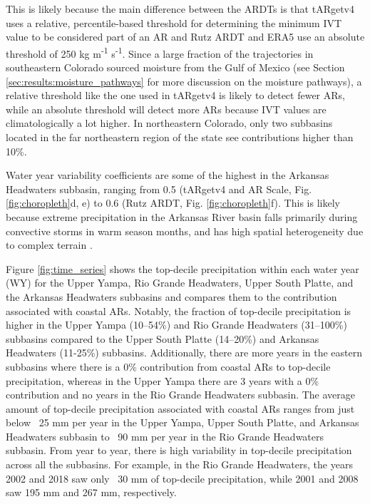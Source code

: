 \documentclass[draft]{agujournal2019}
\begin{document}
This is likely because the main difference between the ARDTs is that tARgetv4 uses a relative, percentile-based threshold for determining the minimum IVT value to be considered part of an AR and Rutz ARDT and ERA5 use an absolute threshold of 250 kg m\textsuperscript{-1} s\textsuperscript{-1}. Since a large fraction of the trajectories in southeastern Colorado sourced moisture from the Gulf of Mexico (see Section \ref{sec:results:moisture_pathways} for more discussion on the moisture pathways), a relative threshold like the one used in tARgetv4 is likely to detect fewer ARs, while an absolute threshold will detect more ARs because IVT values are climatologically a lot higher. In northeastern Colorado, only two subbasins located in the far northeastern region of the state see contributions higher than 10\%. 

Water year variability coefficients are some of the highest in the Arkansas Headwaters subbasin, ranging from 0.5 (tARgetv4 and AR Scale, Fig. \ref{fig:choropleth}d, e) to 0.6 (Rutz ARDT, Fig. \ref{fig:choropleth}f). This is likely because extreme precipitation in the Arkansas River basin falls primarily during convective storms in warm season months, and has high spatial heterogeneity due to complex terrain \cite{Javier2007ClimatologyBasin}.

Figure \ref{fig:time_series} shows the top-decile precipitation within each water year (WY) for the Upper Yampa, Rio Grande Headwaters, Upper South Platte, and the Arkansas Headwaters subbasins and compares them to the contribution associated with coastal ARs. Notably, the fraction of top-decile precipitation is higher in the Upper Yampa (10--54\%) and Rio Grande Headwaters (31--100\%) subbasins compared to the Upper South Platte (14--20\%) and Arkansas Headwaters (11-25\%) subbasins. Additionally, there are more years in the eastern subbasins where there is a 0\% contribution from coastal ARs to top-decile precipitation, whereas in the Upper Yampa there are 3 years with a 0\% contribution and no years in the Rio Grande Headwaters subbasin. The average amount of top-decile precipitation associated with coastal ARs ranges from just below ~25 mm per year in the Upper Yampa, Upper South Platte, and Arkansas Headwaters subbasin to ~90 mm per year in the Rio Grande Headwaters subbasin. From year to year, there is high variability in top-decile precipitation across all the subbasins. For example, in the Rio Grande Headwaters, the years 2002 and 2018 saw only ~30 mm of top-decile precipitation, while 2001 and 2008 saw 195 mm and 267 mm, respectively. 
\end{document}
